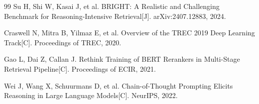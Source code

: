 \documentclass[12pt,a4paper]{article}
\begin{document}
\begin{thebibliography}{99}
 Su H, Shi W, Kasai J, et al. BRIGHT: A Realistic and Challenging Benchmark for Reasoning-Intensive Retrieval[J]. arXiv:2407.12883, 2024.

 Craswell N, Mitra B, Yilmaz E, et al. Overview of the TREC 2019 Deep Learning Track[C]. Proceedings of TREC, 2020.

 Gao L, Dai Z, Callan J. Rethink Training of BERT Rerankers in Multi-Stage Retrieval Pipeline[C]. Proceedings of ECIR, 2021.

 Wei J, Wang X, Schuurmans D, et al. Chain-of-Thought Prompting Elicits Reasoning in Large Language Models[C]. NeurIPS, 2022.

\end{thebibliography}
\end{document}
